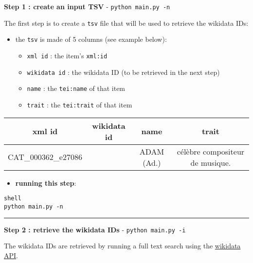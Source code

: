 \textbf{Step 1 : create an input TSV} - \texttt{python main.py -n}

The first step is to create a \texttt{tsv} file that will be used to retrieve the wikidata IDs:

\begin{itemize}
\item the \texttt{tsv} is made of 5 columns (see example below):
\begin{itemize} 
 \item \texttt{xml id} : the item's \texttt{xml:id}
\item \texttt{wikidata id} : the wikidata ID (to be retrieved in the next step)
\item \texttt{name} : the \texttt{tei:name} of that item
\item \texttt{trait} : the \texttt{tei:trait} of that item 
\end{itemize}
\end{itemize}

\begin{table}[h]
\begin{tabular}{c|c|c|c}
xml id & wikidata id & name & trait \\
\hline 
CAT\_000362\_e27086 & & ADAM (Ad.) & célèbre compositeur de musique.
\end{tabular}
\end{table}


\begin{itemize}
\item \textbf{running this step}: 
\end{itemize}

\begin{lstlisting}
shell
python main.py -n
\end{lstlisting}

\par\noindent\rule{\linewidth}{0.4pt}

\textbf{Step 2 : retrieve the wikidata IDs} - \texttt{python main.py -i}

The wikidata IDs are retrieved by running a full text search using the 
\href{https://www.wikidata.org/w/api.php}{wikidata API}. 

